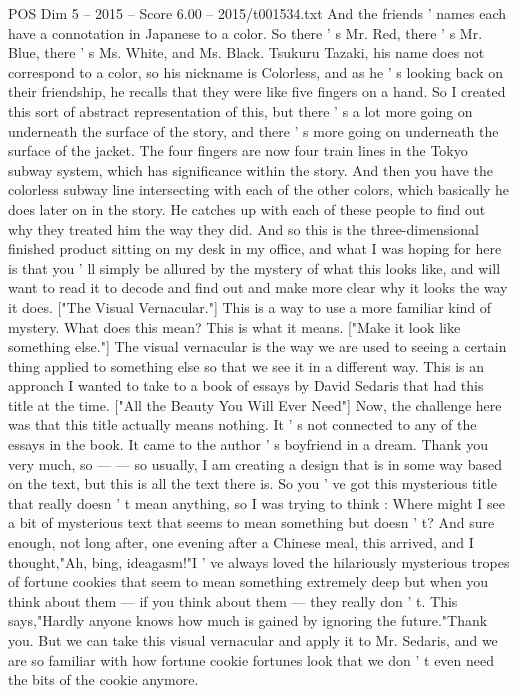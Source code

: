 \begin{textsample}{POS Dim 5 – 2015 – Score 6.00 – 2015/t001534.txt}
And the friends ' names each have a connotation in Japanese to a color.
So there ' s Mr.
Red, there ' s Mr.
Blue, there ' s Ms.
White, and Ms.
Black.
Tsukuru Tazaki, his name does not correspond to a color, so his nickname is Colorless, and as he ' s looking back on their friendship, he recalls that they were like five fingers on a hand.
So I created this sort of abstract representation of this, but there ' s a lot more going on underneath the surface of the story, and there ' s more going on underneath the surface of the jacket.
The four fingers are now four train lines in the Tokyo subway system, which has significance within the story.
And then you have the colorless subway line intersecting with each of the other colors, which basically he does later on in the story.
He catches up with each of these people to find out why they treated him the way they did.
And so this is the three-dimensional finished product sitting on my desk in my office, and what I was hoping for here is that you ' ll simply be allured by the mystery of what this looks like, and will want to read it to decode and find out and make more clear why it looks the way it does. ["The Visual Vernacular."] This is a way to use a more familiar kind of mystery.
What does this mean?
This is what it means. ["Make it look like something else."] The visual vernacular is the way we are used to seeing a certain thing applied to something else so that we see it in a different way.
This is an approach I wanted to take to a book of essays by David Sedaris that had this title at the time. ["All the Beauty You Will Ever Need"] Now, the challenge here was that this title actually means nothing.
It ' s not connected to any of the essays in the book.
It came to the author ' s boyfriend in a dream.
Thank you very much, so — — so usually, I am creating a design that is in some way based on the text, but this is all the text there is.
So you ' ve got this mysterious title that really doesn ' t mean anything, so I was trying to think : Where might I see a bit of mysterious text that seems to mean something but doesn ' t?
And sure enough, not long after, one evening after a Chinese meal, this arrived, and I thought,"Ah, bing, ideagasm!"I ' ve always loved the hilariously mysterious tropes of fortune cookies that seem to mean something extremely deep but when you think about them — if you think about them — they really don ' t.
This says,"Hardly anyone knows how much is gained by ignoring the future."Thank you.
But we can take this visual vernacular and apply it to Mr.
Sedaris, and we are so familiar with how fortune cookie fortunes look that we don ' t even need the bits of the cookie anymore.

\end{textsample}
